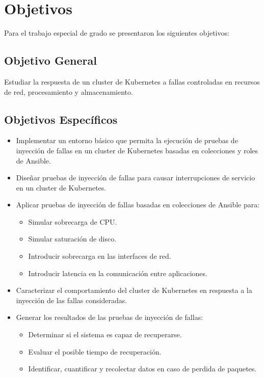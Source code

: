 \section{Objetivos}\label{sec:41}
\par Para el trabajo especial de grado se presentaron los siguientes objetivos:

\subsection{Objetivo General}


\par Estudiar la respuesta de un cluster de Kubernetes a fallas controladas en recursos de red, procesamiento y almacenamiento.

\subsection{Objetivos Específicos}
\begin{itemize}    
    \item Implementar un entorno básico que permita la ejecución de pruebas de inyección de fallas en un cluster de Kubernetes basadas en colecciones y roles de Ansible.
    \item Diseñar pruebas de inyección de fallas para causar interrupciones de servicio en un cluster de Kubernetes.
    \item Aplicar pruebas de inyección de fallas basadas en colecciones de Ansible para:
    \begin{itemize}
        \item Simular sobrecarga de CPU.
        \item Simular saturación de disco. 
        \item Introducir sobrecarga en las interfaces de red.
        \item Introducir latencia en la comunicación entre aplicaciones.
    \end{itemize}
    \item Caracterizar el comportamiento del cluster de Kubernetes en respuesta a la inyección de las fallas consideradas.
    \item Generar los resultados de las pruebas de inyección de fallas:
    \begin{itemize}
        \item Determinar si el sistema es capaz de recuperarse.
        \item Evaluar el posible tiempo de recuperación.
        \item Identificar, cuantificar y recolectar datos en caso de perdida de paquetes.
    \end{itemize}
\end{itemize}
